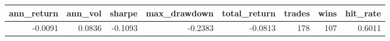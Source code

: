 
\begin{tabular}{rrrrrrrr}
\toprule
ann\_return & ann\_vol & sharpe & max\_drawdown & total\_return & trades & wins & hit\_rate\\
\midrule
-0.0091 & 0.0836 & -0.1093 & -0.2383 & -0.0813 & 178 & 107 & 0.6011\\
\bottomrule
\end{tabular}
